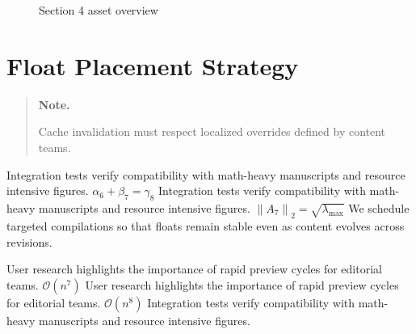 \documentclass[12pt,a4paper,twocolumn]{article}
\newcommand{\paraid}[1]{\par\noindent\hypertarget{#1}{\ignorespaces}}
\begin{document}
\begin{figure}[htbp]
\centering
\hypertarget{fig-sec4}{}


\caption{Section 4 asset overview}
\label{fig:fig-sec4}
\hypertarget{fig-sec4-end}{}
\end{figure}


\section{Float Placement Strategy}
\label{sec5}

\begin{quote}
\hypertarget{sec5-note}{\textbf{Note.}} 
      Cache invalidation must respect localized overrides defined by content teams.
    
\end{quote}

\paraid{sec5-p1}Integration tests verify compatibility with math-heavy manuscripts and resource intensive figures. $\alpha_{6} + \beta_{7} = \gamma_{8}$ Integration tests verify compatibility with math-heavy manuscripts and resource intensive figures. $\left\|A_{7}\right\|_{2} = \sqrt{\lambda_{\max}}$ We schedule targeted compilations so that floats remain stable even as content evolves across revisions.
\par

\paraid{sec5-p2}User research highlights the importance of rapid preview cycles for editorial teams. $\mathcal{O}(n^{7})$ User research highlights the importance of rapid preview cycles for editorial teams. $\mathcal{O}(n^{8})$ Integration tests verify compatibility with math-heavy manuscripts and resource intensive figures.
\par
\end{document}
